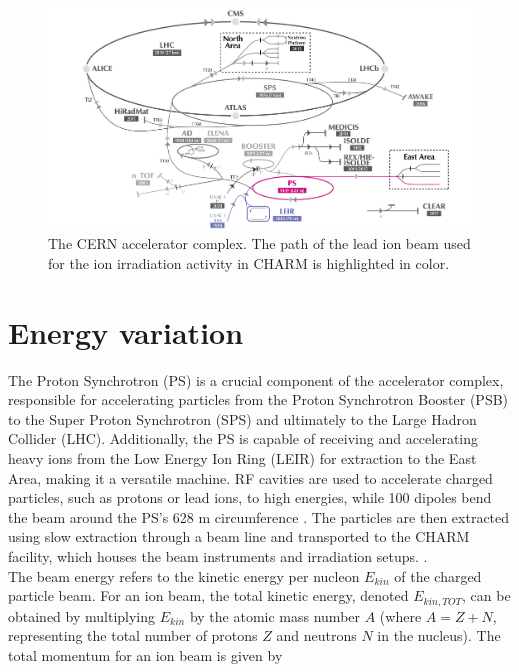 \documentclass{cernatsnote}
\begin{document}
\begin{figure}[!htb]
\centering
\includegraphics[width=1.0\textwidth]{images/CCC_eastt8_small.png}
\caption{The CERN accelerator complex. The path of the lead ion beam used for the ion irradiation activity in CHARM is highlighted in color.}
\label{fig:CCC}
\end{figure}


\section{Energy variation}

The Proton Synchrotron (PS) is a crucial component of the accelerator complex, responsible for accelerating particles from the Proton Synchrotron Booster (PSB) to the Super Proton Synchrotron (SPS) and ultimately to the Large Hadron Collider (LHC). Additionally, the PS is capable of receiving and accelerating heavy ions from the Low Energy Ion Ring (LEIR) for extraction to the East Area, making it a versatile machine. RF cavities are used to accelerate charged particles, such as protons or lead ions, to high energies, while 100 dipoles bend the beam around the PS's 628 m circumference \cite{gilardoni_fifty_2011}. The particles are then extracted using slow extraction through a beam line and transported to the CHARM facility, which houses the beam instruments and irradiation setups. .
\\

The beam energy refers to the kinetic energy per nucleon $E_{kin}$ of the charged particle beam. For an ion beam, the total kinetic energy, denoted $E_{kin, TOT}$, can be obtained by multiplying $E_{kin}$ by the atomic mass number $A$ (where $A = Z + N$, representing the total number of protons $Z$ and neutrons $N$ in the nucleus). The total momentum for an ion beam is given by \cite{chao_handbook_2013}
\end{document}
